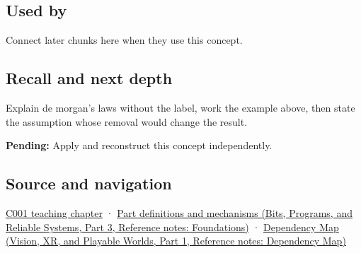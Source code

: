 \subsection{Used by}\label{appendix-9079d3659da4-used-by}

\hypertarget{appendix-9079d3659da4-used-by}{}

Connect later chunks here when they use this concept.

\subsection{Recall and next depth}\label{appendix-9079d3659da4-recall-and-next-depth}

\hypertarget{appendix-9079d3659da4-recall-and-next-depth}{}

Explain de morgan's laws without the label, work the example above, then state the assumption whose removal would change the result.

\textbf{Pending:} Apply and reconstruct this concept independently.

\subsection{Source and navigation}\label{appendix-9079d3659da4-source-and-navigation}

\hypertarget{appendix-9079d3659da4-source-and-navigation}{}

\hyperref[01-foundations-i-ch001-from-a-signal-to-an-interpretation]{C001 teaching chapter} · \href{../01-Bits-Programs-and-Reliable-Systems-P03/main.pdf\#appendix-fd090d982a15}{Part definitions and mechanisms (Bits, Programs, and Reliable Systems, Part 3, Reference notes: Foundations)} · \href{../07-Vision-XR-and-Playable-Worlds-P01/main.pdf\#appendix-4ad47bdd269a}{Dependency Map (Vision, XR, and Playable Worlds, Part 1, Reference notes: Dependency Map)}
